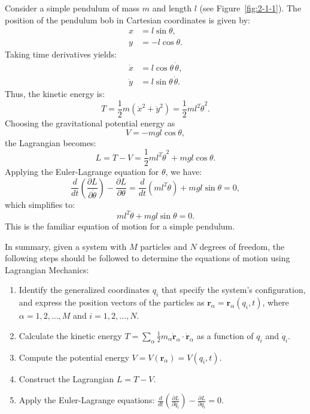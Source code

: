 Consider a simple pendulum of mass $m$ and length $l$ (see Figure~\ref{fig:2-1-1}). The position of the pendulum bob in Cartesian coordinates is given by:
\begin{align}
    x & = l\sin\theta,  \\
    y & = -l\cos\theta.
\end{align}
Taking time derivatives yields:
\begin{align}
    \dot{x} & = l\cos\theta\,\dot{\theta}, \\
    \dot{y} & = l\sin\theta\,\dot{\theta}.
\end{align}
Thus, the kinetic energy is:
\begin{equation}
    T = \frac{1}{2} m (\dot{x}^2 + \dot{y}^2) = \frac{1}{2}ml^2\dot{\theta}^2.
\end{equation}
Choosing the gravitational potential energy as
\begin{equation}
    V = -mgl\cos\theta,
\end{equation}
the Lagrangian becomes:
\begin{equation}
    L = T - V = \frac{1}{2}ml^2\dot{\theta}^2 + mgl\cos\theta.
\end{equation}
Applying the Euler-Lagrange equation for $\theta$, we have:
\begin{equation}
    \frac{d}{dt}\left(\frac{\partial L}{\partial\dot{\theta}}\right) - \frac{\partial L}{\partial\theta} = \frac{d}{dt}(ml^2\dot{\theta}) + mgl\sin\theta = 0,
\end{equation}
which simplifies to:
\begin{equation}
    ml^2\ddot{\theta} + mgl\sin\theta = 0.
\end{equation}
This is the familiar equation of motion for a simple pendulum.

In summary, given a system with $M$ particles and $N$ degrees of freedom, the following
steps should be followed to determine the equations of motion using Lagrangian Mechanics:

\begin{enumerate}
    \item Identify the generalized coordinates $q_i$ that specify the system's
          configuration, and express the position vectors of the particles as
          $\mathbf{r}_\alpha=\mathbf{r}_\alpha(q_i, t)$, where $\alpha = 1, 2, \dots, M$ and
          $i = 1, 2, \dots, N$.
    \item Calculate the kinetic energy
          $T = \sum_\alpha \frac{1}{2} m_\alpha \dot{\mathbf{r}}_\alpha \cdot \dot{\mathbf{r}}_\alpha$
          as a function of $q_i$ and $\dot{q}_i$.
    \item Compute the potential energy $V = V(\mathbf{r}_\alpha) = V(q_i, t)$.
    \item Construct the Lagrangian $L = T - V$.
    \item Apply the Euler-Lagrange equations:
          $\frac{d}{dt} \left(\frac{\partial L}{\partial \dot{q}_i}\right) - \frac{\partial L}{\partial q_i} = 0$.
\end{enumerate}

